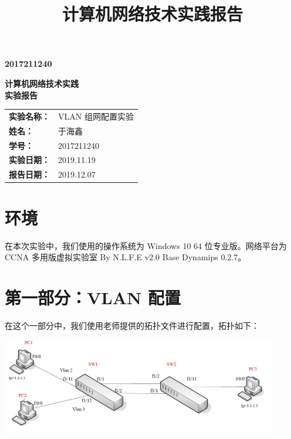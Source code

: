 \documentclass[black,normal,cn]{elegantnote}
\title{计算机网络技术实践报告}
\begin{document}
\begin{titlepage}
    \bfseries{2017211240}
    \vspace{4cm}
    \begin{center}
        \bfseries\huge{计算机网络技术实践}\\
        \vspace{0.5cm}
        \bfseries\huge{实验报告}
        \vspace{3cm}
        \begin{center}
          \large
          \linespread{2}
          \centering
          \renewcommand\arraystretch{1.6}
          \begin{tabular}{p{3cm}P{6cm}}
            \bfseries{实验名称：}       & VLAN 组网配置实验   \\ 
            \bfseries{姓名：}           & 于海鑫   \\ 
            \bfseries{学号：}           & 2017211240  \\ 
            \bfseries{实验日期：}        & 2019.11.19 \\ 
            \bfseries{报告日期：}        & 2019.12.07 \\ 
          \end{tabular}
        \end{center}
      \end{center}
\end{titlepage}

\section{环境}
在本次实验中，我们使用的操作系统为 Windows 10 64 位专业版。网络平台为
CCNA 多用版虚拟实验室 By N.L.F.E v2.0 Base Dynamips 0.2.7。

\section{第一部分：VLAN 配置}

在这个一部分中，我们使用老师提供的拓扑文件进行配置，拓扑如下：

\includegraphics[width=0.9\textwidth]{ref1}
\end{document}
